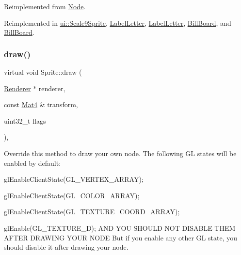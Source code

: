 Reimplemented from \hyperlink{classNode_abcf85087a15901deb7c6c1231634c8ab}{Node}.



Reimplemented in \hyperlink{classui_1_1Scale9Sprite_ae16122e957d7bc7de809d06006b7d6f3}{ui\+::\+Scale9\+Sprite}, \hyperlink{classLabelLetter_a676b176ed411500ac50b45c7cb104ce0}{Label\+Letter}, \hyperlink{classLabelLetter_a3e0850000ea292406f5d905a431b03dc}{Label\+Letter}, \hyperlink{classBillBoard_a61816c66a9b5dbfbe12cf1bd747f5229}{Bill\+Board}, and \hyperlink{classBillBoard_ab8ccc9dc2cbbf46f1f2a56cd0283ce94}{Bill\+Board}.

\mbox{\label{classSprite_a6f6d6ad4411cf330f18663f04952fdf6}} 
\subsubsection{\texorpdfstring{draw()}{draw()}\hspace{0.1cm}{\footnotesize\ttfamily [2/2]}}
{\footnotesize\ttfamily virtual void Sprite\+::draw (\begin{DoxyParamCaption}\item[{\hyperlink{classRenderer}{Renderer} $\ast$}]{renderer,  }\item[{const \hyperlink{classMat4}{Mat4} \&}]{transform,  }\item[{uint32\+\_\+t}]{flags }\end{DoxyParamCaption})\hspace{0.3cm}{\ttfamily [override]}, {\ttfamily [virtual]}}

Override this method to draw your own node. The following GL states will be enabled by default\+:
\begin{DoxyItemize}
\item {\ttfamily gl\+Enable\+Client\+State(\+G\+L\+\_\+\+V\+E\+R\+T\+E\+X\+\_\+\+A\+R\+R\+A\+Y);}
\item {\ttfamily gl\+Enable\+Client\+State(\+G\+L\+\_\+\+C\+O\+L\+O\+R\+\_\+\+A\+R\+R\+A\+Y);}
\item {\ttfamily gl\+Enable\+Client\+State(\+G\+L\+\_\+\+T\+E\+X\+T\+U\+R\+E\+\_\+\+C\+O\+O\+R\+D\+\_\+\+A\+R\+R\+A\+Y);}
\item {\ttfamily gl\+Enable(\+G\+L\+\_\+\+T\+E\+X\+T\+U\+R\+E\+\_\+D);} A\+ND Y\+OU S\+H\+O\+U\+LD N\+OT D\+I\+S\+A\+B\+LE T\+H\+EM A\+F\+T\+ER D\+R\+A\+W\+I\+NG Y\+O\+UR N\+O\+DE But if you enable any other GL state, you should disable it after drawing your node.
\end{DoxyItemize}


